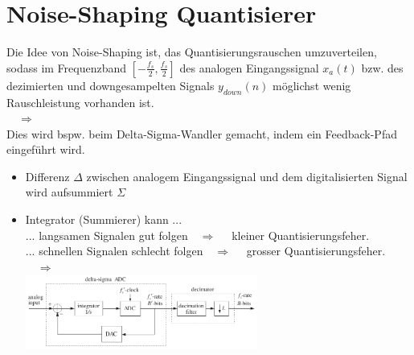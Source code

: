 \section{Noise-Shaping Quantisierer}
		Die Idee von Noise-Shaping ist, das Quantisierungsrauschen umzuverteilen, sodass im Frequenzband $[-\frac{f_s}{2},\frac{f_s}{2}]$ des analogen Eingangssignal $x_a(t)$ bzw. des dezimierten und downgesampelten Signals $y_{down}(n)$ möglichst wenig Rauschleistung vorhanden ist.\\[0.2cm]
		\hspace*{0cm}$\quad\Rightarrow\quad$\\[0.3cm]
		Dies wird bspw. beim Delta-Sigma-Wandler gemacht, indem ein Feedback-Pfad eingeführt wird.\\[-0.6cm]
		\begin{itemize}
		 \item Differenz $\Delta$ zwischen analogem Eingangssignal und dem digitalisierten Signal wird aufsummiert $\Sigma$\\[-0.6cm]
		 \item Integrator (Summierer) kann ...\\
		 ... langsamen Signalen gut folgen$\quad\Rightarrow\quad$ kleiner Quantisierungsfeher.\\
		 ... schnellen Signalen schlecht folgen$\quad\Rightarrow\quad$ grosser Quantisierungsfeher.\\ [0.2cm]
		 $\quad\Rightarrow\quad$ \\[0.2cm]
		 \includegraphics[width = 0.6\textwidth]{pic/sigmaDelta.pdf}
		\end{itemize}

